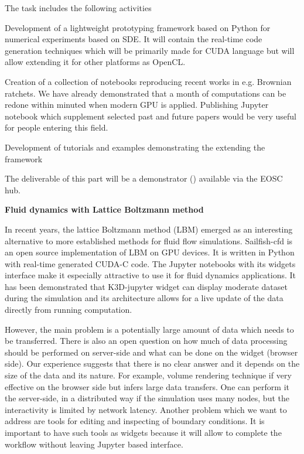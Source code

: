 \begin{task}[
  title=Application: Reproducible research based on GPU,
  id=application-gpu,
  lead=SIL,
  PM=12,
  wphases={4-36},
  partners={}
]
The task includes the following activities

  \begin{compactitem}
  \item Development of a lightweight prototyping framework based on Python for numerical experiments based on SDE. It will contain the real-time code generation techniques which will be primarily made for CUDA language but will allow extending it for other platforms as OpenCL. 
  \item Creation of a collection of notebooks reproducing recent works in e.g. Brownian ratchets. We have already demonstrated \cite{januszewski2010accelerating,spiechowicz2015gpu} that a month of computations can be redone within minuted when modern GPU is applied. Publishing Jupyter notebook which supplement selected past and future papers would be very useful for people entering this field.  
  \item Development of tutorials and examples demonstrating the extending the framework
    
  \end{compactitem}

The deliverable of this part will be a demonstrator () available via the EOSC hub.


\textbf{Fluid dynamics with Lattice Boltzmann method}

In recent years, the lattice Boltzmann method (LBM) emerged as an interesting alternative to more established methods for fluid flow simulations. Sailfish-cfd \cite{januszewski2014sailfish} is an open source implementation of LBM on GPU devices. It is written in Python with real-time generated CUDA-C code. The Jupyter notebooks with its widgets interface make it especially attractive to use it for fluid dynamics applications. It has been demonstrated that K3D-jupyter widget can display moderate dataset during the simulation and its architecture allows for a live update of the data directly from running computation.

However, the main problem is a potentially large amount of data which needs to be transferred. There is also an open question on how much of data processing should be performed on server-side and what can be done on the widget (browser side). Our experience suggests that there is no clear answer and it depends on the size of the data and its nature. For example, volume rendering technique if very effective on the browser side but infers large data transfers. One can perform it the server-side, in a distributed way if the simulation uses many nodes, but the interactivity is limited by network latency. 
Another problem which we want to address are tools for editing and inspecting of boundary conditions. It is important to have such tools as widgets because it will allow to complete the workflow without leaving Jupyter based interface.




\end{task}
